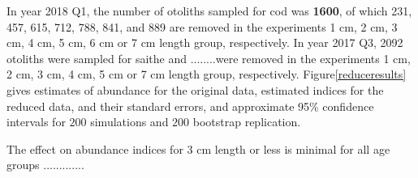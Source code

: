 \documentclass[a4paper 12pt]{article}
\numberwithin{equation}{section}
\begin{document}
%
%


In year 2018 Q1, the number of otoliths sampled for cod was {\bf 1600}, of which 231, 457, 615, 712, 788, 841, and 889 are removed in the experiments 1 cm, 2 cm, 3 cm, 4 cm, 5 cm, 6 cm or 7 cm length group, respectively. In year 2017 Q3, 2092 otoliths were sampled for saithe and ........were removed in the experiments 1 cm, 2 cm, 3 cm, 4 cm, 5 cm or 7 cm length group, respectively. Figure\ref{reduceresults} gives estimates of abundance for the original data, estimated indices for the reduced data, and their standard errors, and approximate 95\% confidence intervals for  $200$ simulations and $200$ bootstrap replication. 

The effect on abundance indices for 3 cm length or less is minimal for all age groups ............. 
\end{document}
